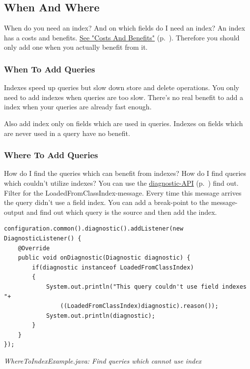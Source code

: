 \subsection{When And Where}
\label{ref:basics-indexing-when-and-where}

When do you need an index? And on which fields do I need an index? An index has a costs and benefits. \hyperref[ref:basics-indexing-costs-and-benefits]{See "Costs And Benefits"} (p.~\pageref{ref:basics-indexing-costs-and-benefits}). Therefore you should only add one when you actually benefit from it.

\subsubsection*{When To Add Queries}

Indexes speed up queries but slow down store and delete operations. You only need to add indexes when queries are too slow. There's no real benefit to add a index when your queries are already fast enough.

Also add index only on fields which are used in queries. Indexes on fields which are never used in a query have no benefit.

\subsubsection*{Where To Add Queries}

How do I find the queries which can benefit from indexes? How do I find queries which couldn't utilize indexes? You can use the \hyperref[ref:configuration-common-diagnostics]{diagnostic-API} (p.~\pageref{ref:configuration-common-diagnostics}) find out. Filter for the LoadedFromClassIndex-message. Every time this message arrives the query didn't use a field index. You can add a break-point to the message-output and find out which query is the source and then add the index.

\begin{lstlisting}
configuration.common().diagnostic().addListener(new DiagnosticListener() {
    @Override
    public void onDiagnostic(Diagnostic diagnostic) {
        if(diagnostic instanceof LoadedFromClassIndex)
        {
            System.out.println("This query couldn't use field indexes "+
                ((LoadedFromClassIndex)diagnostic).reason());
            System.out.println(diagnostic);
        }
    }
});
\end{lstlisting}

{\small\itshape WhereToIndexExample.java: Find queries which cannot use index\par}
\medskip

